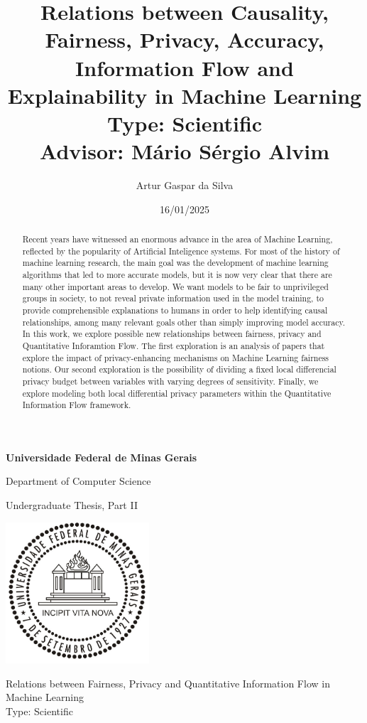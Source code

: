 \documentclass[conference]{IEEEtran}
\title{Relations between Causality, Fairness, Privacy, Accuracy, Information Flow and Explainability in Machine Learning\large\\ Type: Scientific\\Advisor: Mário Sérgio Alvim}
\author{Artur Gaspar da Silva}
\date{16/01/2025}
\begin{document}
\begin{titlepage}
    \begin{center}

        \Huge
        \textbf{Universidade Federal de Minas Gerais}

        \vspace{0.5cm}
        \LARGE
            Department of Computer Science

        \vspace{0.5cm}
        \large
           Undergraduate Thesis, Part II 

        \vspace{0.7cm}

        \includegraphics[width=0.4\textwidth]{logoUFMG.jpg}



        \vspace{0.5cm}

        \Huge
            Relations between Fairness, Privacy and Quantitative Information Flow in Machine Learning
            \\\large Type: Scientific

        \vspace{0.5cm}
        \begin{abstract}
            Recent years have witnessed an enormous advance in the area of Machine Learning, reflected by the popularity of Artificial Inteligence systems. For most of the history of machine learning research, the main goal was the development of machine learning algorithms that led to more accurate models, but it is now very clear that there are many other important areas to develop. We want models to be fair to unprivileged groups in society, to not reveal private information used in the model training, to provide comprehensible explanations to humans in order to help identifying causal relationships, among many relevant goals other than simply improving model accuracy. In this work, we explore possible new relationships between fairness, privacy and Quantitative Inforamtion Flow. The first exploration is an analysis of papers that explore the impact of privacy-enhancing mechanisms on Machine Learning fairness notions. Our second exploration is the possibility of dividing a fixed local differencial privacy budget between variables with varying degrees of sensitivity. Finally, we explore modeling both local differential privacy parameters within the Quantitative Information Flow framework.
        \end{abstract}


\end{center}
\end{titlepage}
\end{document}

